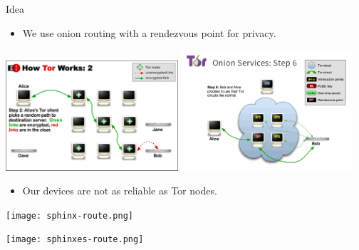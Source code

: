 \begin{frame}
  \begin{block}{Idea}
    \begin{itemize}
      \item We use onion routing with a rendezvous point for privacy.
    \end{itemize}
  \end{block}

  \includegraphics[width=0.48\textwidth]{fig/tor.png}
  \hfill
  \includegraphics[width=0.48\textwidth]{fig/tor-hs.png}

  \pause

  \begin{remark}
    \begin{itemize}
      \item Our devices are not as reliable as Tor nodes.
    \end{itemize}
  \end{remark}
\end{frame}

\begin{frame}
  \begin{center}
    \texttt{[image: sphinx-route.png]}
  \end{center}

  \begin{center}
    \texttt{[image: sphinxes-route.png]}
  \end{center}
\end{frame}


